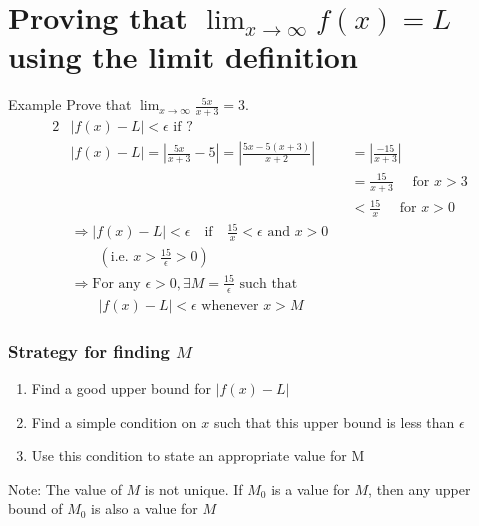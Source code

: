 \documentclass{report}
\begin{document}
\section{Proving that $\displaystyle\lim_{x\to\infty} f(x) = L$ using the limit definition}

	\begin{question}{Example}
		Prove that $\displaystyle\lim_{x\to\infty} \frac{5x}{x+3} = 3$.
		\begin{alignat*}{2}
			& \left|f(x) - L\right| < \epsilon \text{ if ?}	\\
			& \left|f(x) - L\right| = \left|\frac{5x}{x+3} - 5 \right| = \left|\frac{5x - 5(x+3)}{x+2}\right| &&= \left|\frac{-15}{x+3}\right|	\\
			& && = \frac{15}{x+3} \quad \text{ for } x > 3	\\
			& && < \frac{15}{x} \quad \text{ for } x > 0	\\
			& \Rightarrow \left|f(x) - L\right| < \epsilon \quad \text{if} \quad \frac{15}{x} < \epsilon \text{ and } x > 0 	\\
			& \qquad (\text{i.e. } x > \frac{15}{\epsilon} > 0)	\\
			& \Rightarrow \text{For any } \epsilon > 0, \exists M = \frac{15}{\epsilon} \text{ such that }	\\
			& \qquad |f(x) - L| < \epsilon \text{ whenever } x > M
		\end{alignat*}
	\end{question}

	\subsubsection{Strategy for finding $M$}

		\begin{enumerate}
			\item Find a good upper bound for $|f(x) - L|$
			\item Find a simple condition on $x$ such that this upper bound is less than $\epsilon$
			\item Use this condition to state an appropriate value for M
		\end{enumerate}

		\textcolor{pastel_red}{Note:} The value of $M$ is not unique. If $M_0$ is a value for $M$, then any upper bound of $M_0$ is also a value for $M$
\end{document}
